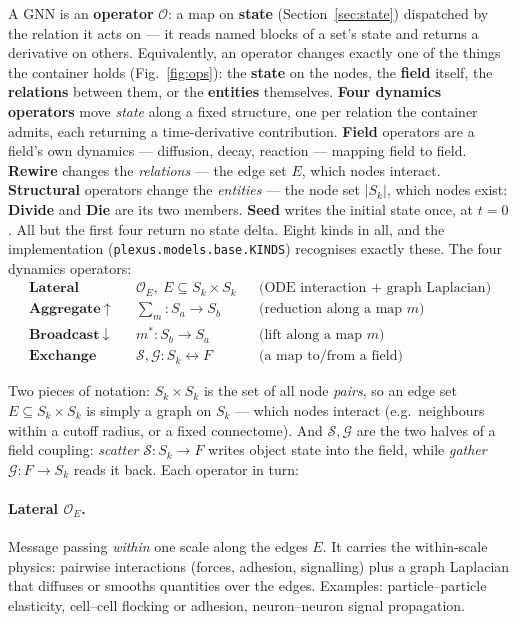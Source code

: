 \documentclass[11pt]{article}
\newcommand{\code}[1]{\texttt{#1}}
\begin{document}
A GNN is an \textbf{operator} $\mathcal{O}$: a map on \textbf{state}
(Section~\ref{sec:state}) dispatched by the relation it acts on --- it reads named
blocks of a set's state and returns a derivative on others. Equivalently, an operator
changes exactly one of the things the container holds
(Fig.~\ref{fig:ops}): the \textbf{state} on the nodes, the \textbf{field} itself, the
\textbf{relations} between them, or the \textbf{entities} themselves. \textbf{Four dynamics
operators} move \emph{state} along a fixed structure, one per relation the container admits,
each returning a time-derivative contribution. \textbf{Field} operators are a field's own
dynamics --- diffusion, decay, reaction --- mapping field to field. \textbf{Rewire} changes the
\emph{relations} --- the edge set $E$, which nodes interact. \textbf{Structural} operators change
the \emph{entities} --- the node set $|S_k|$, which nodes exist: \textbf{Divide} and \textbf{Die}
are its two members. \textbf{Seed} writes the initial state once, at $t=0$. All but the first four
return no state delta. Eight kinds in all, and the implementation
(\code{plexus.models.base.KINDS}) recognises exactly these. The four dynamics operators:
\begin{align*}
\textbf{Lateral}\quad   & \mathcal{O}_E,\ E\subseteq S_k\times S_k
  &&\text{(ODE interaction $+$ graph Laplacian)}\\
\textbf{Aggregate}\ \uparrow\quad & \textstyle\sum_{m}: S_a \to S_b
  &&\text{(reduction along a map $m$)}\\
\textbf{Broadcast}\ \downarrow\quad & m^{*}: S_b\to S_a
  &&\text{(lift along a map $m$)}\\
\textbf{Exchange}\quad  & \mathcal{S},\mathcal{G}: S_k \leftrightarrow F
  &&\text{(a map to/from a field)}
\end{align*}

\noindent Two pieces of notation: $S_k\times S_k$ is the set of all node \emph{pairs}, so an
edge set $E\subseteq S_k\times S_k$ is simply a graph on $S_k$ --- which nodes
interact (e.g.\ neighbours within a cutoff radius, or a fixed connectome). And
$\mathcal{S},\mathcal{G}$ are the two halves of a field coupling: \emph{scatter}
$\mathcal{S}:S_k\to F$ writes object state into the field, while \emph{gather}
$\mathcal{G}:F\to S_k$ reads it back. Each operator in turn:

\paragraph{Lateral $\mathcal{O}_E$.} Message passing \emph{within} one scale along
the edges $E$. It carries the within-scale physics: pairwise interactions (forces,
adhesion, signalling) plus a graph Laplacian that diffuses or smooths quantities
over the edges. Examples: particle--particle elasticity, cell--cell flocking or
adhesion, neuron--neuron signal propagation.
\end{document}
